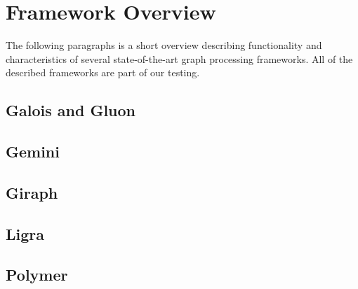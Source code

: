
\section{Framework Overview}
The following paragraphs is a short overview describing functionality and characteristics of several state-of-the-art graph processing frameworks.
All of the described frameworks are part of our testing.
\todo

\subsection{Galois and Gluon}


\subsection{Gemini}


\subsection{Giraph}


\subsection{Ligra}


\subsection{Polymer}





